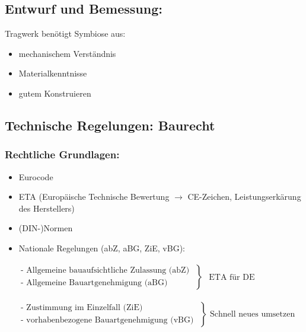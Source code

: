 \documentclass[fleqn,twoside]{article}
\begin{document}
\subsection{Entwurf und Bemessung:}
    Tragwerk benötigt Symbiose aus:
    \begin{itemize}
        \item mechanischem Verständnis
        \item Materialkenntnisse
        \item gutem Konstruieren
    \end{itemize}

\subsection{Technische Regelungen: Baurecht}
    \subsubsection{Rechtliche Grundlagen:}
    \begin{itemize}
        \item Eurocode
        \item ETA (Europäische Technische Bewertung $\rightarrow$ CE-Zeichen, Leistungserkärung des Herstellers)
        \item (DIN-)Normen
        \item Nationale Regelungen (abZ, aBG, ZiE, vBG):
        \end{itemize}
            \hspace*{5mm} $\begin{aligned}&\left.
            \begin{array}{l}
                \text { - Allgemeine bauaufsichtliche Zulassung (abZ) } \\
                \text { - Allgemeine Bauartgenehmigung (aBG) }
            \end{array}\right\} 
                \begin{array}{l}
                \text { ETA für DE} 
                \end{array}
            \end{aligned}$
            
            \hspace*{5mm} $\begin{aligned}&\left.
                \begin{array}{l}
                    \text { - Zustimmung im Einzelfall (ZiE) } \\
                    \text { - vorhabenbezogene Bauartgenehmigung (vBG) }    
                \end{array}\right\} \text { Schnell neues umsetzen }
            \end{aligned}$
\end{document}

